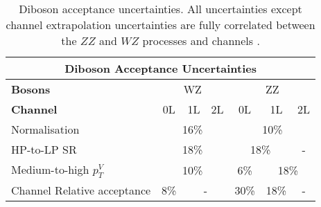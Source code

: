 \begin{table}[!htbp] 
    \footnotesize\centering
    \setlength{\tabcolsep}{0.5em} %
    \begin{tabular}{l|c|c|c|c|c|c}
    \toprule\hline
    \multicolumn{7}{c}{Diboson Acceptance Uncertainties}            
    \\ \hline
    \textbf{Bosons}     & \multicolumn{3}{c|}{{WZ}} & \multicolumn{3}{c}{{ZZ}} 
    \\ \hline
    \textbf{Channel}    &   0L      &   1L    &   2L    &   0L      &   1L      & 2L          
    \\ \hline
    Normalisation       &  \multicolumn{3}{c|}{{16\%}}    &  \multicolumn{3}{c}{{10\%}}
    \\ \hline
    HP-to-LP SR               &   \multicolumn{3}{c|}{{18\%}}   &   \multicolumn{2}{c|}{{18\%}}    &   -      
    \\ \hline
    Medium-to-high $p_T^V$    &    \multicolumn{3}{c|}{{10\%}}     &    6\%    &    \multicolumn{2}{c}{{18\%}}
    \\ \hline
    Channel Relative acceptance     &   8\%    &   \multicolumn{2}{c|}{ - }     &    30\%      &    18\%      &   -
    \\ \hline\bottomrule
    \end{tabular}
    \caption{Diboson acceptance uncertainties. All uncertainties except channel extrapolation uncertainties are fully correlated between the $ZZ$ and $WZ$ processes and channels \cite{Dao:2688371}.}
    \label{tab:diboson_acceptance_uncerts}
\end{table}
        